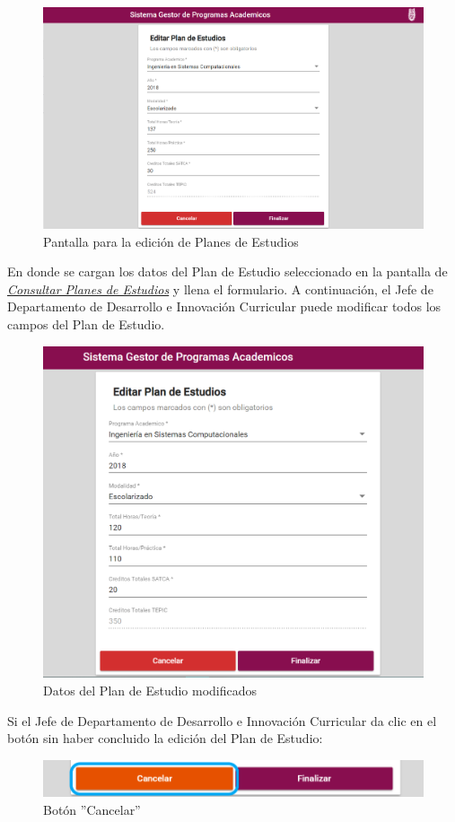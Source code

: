 \begin{figure}[H]
	\centering
	\hypertarget{editarPE}{\includegraphics[width=0.7\linewidth]{images/SP4-GPE/editarPE}}
	\caption{Pantalla para la edición de Planes de Estudios}
	\label{editarPE}
\end{figure}

En donde se cargan los datos del Plan de Estudio seleccionado en la pantalla de \hyperlink{consultarPE}{\textit{Consultar Planes de Estudios}} y llena el formulario.
\newpage
A continuación, el Jefe de Departamento de Desarrollo e Innovación Curricular puede modificar todos los campos del Plan de Estudio.
\begin{figure}[H]
	\centering
	\hypertarget{modif}{\includegraphics[width=0.7\linewidth]{images/SP4-GPE/editarPE1}}
	\caption{Datos del Plan de Estudio modificados}
	\label{modif}
\end{figure}

 Si el Jefe de Departamento de Desarrollo e Innovación Curricular da clic en el botón  sin haber concluido la edición del Plan de Estudio:

\begin{figure}[H]
	\centering
	\hypertarget{cancel2}{\includegraphics[width=0.7\linewidth]{images/SP4-GPE/cancelarPE}}
	\caption{Botón ''Cancelar''}
	\label{cancel2}
\end{figure}
\newpage

